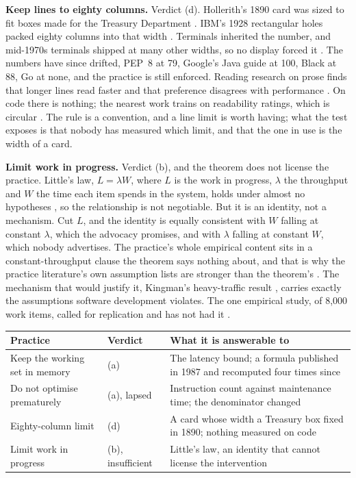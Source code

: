 \documentclass[11pt,oneside]{article}
\theoremstyle{definition}
\theoremstyle{remark}
\begin{document}
\textbf{Keep lines to eighty columns.} Verdict (d). Hollerith's 1890 card was sized to fit
boxes made for the Treasury Department \cite{jones-cards}. IBM's 1928 rectangular holes
packed eighty columns into that width \cite{ibm-card}. Terminals inherited the number, and
mid-1970s terminals shipped at many other widths, so no display forced it
\cite{shirriff2019}. The numbers have since drifted, PEP~8 at 79, Google's Java guide at
100, Black at 88, Go at none, and the practice is still enforced. Reading research on
prose finds that longer lines read faster and that preference disagrees with performance
\cite{dyson2004,bernard2002,nanavati2005}. On code there is nothing; the nearest work trains
on readability ratings, which is circular \cite{buse2010}. The rule is a convention, and a
line limit is worth having; what the test exposes is that nobody has measured which limit,
and that the one in use is the width of a card.

\textbf{Limit work in progress.} Verdict (b), and the theorem does not license the
practice. Little's law, $L=\lambda W$, where $L$ is the work in progress, $\lambda$ the throughput
and $W$ the time each item spends in the system, holds under almost no hypotheses
\cite{little1961,stidham1974}, so the relationship is not negotiable. But it is an
identity, not a mechanism. Cut $L$, and the identity is equally consistent with $W$
falling at constant $\lambda$, which the advocacy promises, and with $\lambda$ falling at
constant $W$, which nobody advertises. The practice's whole empirical content sits in a
constant-throughput clause the theorem says nothing about, and that is why the practice
literature's own assumption lists are stronger than the theorem's
\cite{anderson2016,vacanti2015}. The mechanism that would justify it, Kingman's
heavy-traffic result \cite{kingman1961}, carries exactly the assumptions software
development violates. The one empirical study, of 8,000 work items, called for replication
and has not had it \cite{sjoberg2018}.

\begin{center}
\small
\begin{longtable}{@{}p{}p{}p{}@{}}
\toprule
\textbf{Practice} & \textbf{Verdict} & \textbf{What it is answerable to} \\
\midrule
\endhead
Keep the working set in memory & (a) & The latency bound; a formula published in 1987 and
recomputed four times since \\
\addlinespace
Do not optimise prematurely & (a), lapsed & Instruction count against maintenance time; the
denominator changed \\
\addlinespace
Eighty-column limit & (d) & A card whose width a Treasury box fixed in 1890; nothing measured
on code \\
\addlinespace
Limit work in progress & (b), insufficient & Little's law, an identity that cannot license
the intervention \\
\bottomrule
\end{longtable}
\end{center}
\end{document}
